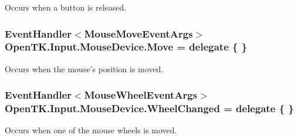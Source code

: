 Occurs when a button is released. 

\hypertarget{class_open_t_k_1_1_input_1_1_mouse_device_ae98bb40aa03f634ecb53a73971dd9097}{
\subsubsection[{Move}]{\setlength{\rightskip}{0pt plus 5cm}Event\-Handler$<${\bf Mouse\-Move\-Event\-Args}$>$ Open\-T\-K.\-Input.\-Mouse\-Device.\-Move = delegate \{ \}}}\label{class_open_t_k_1_1_input_1_1_mouse_device_ae98bb40aa03f634ecb53a73971dd9097}


Occurs when the mouse's position is moved. 

\hypertarget{class_open_t_k_1_1_input_1_1_mouse_device_a4bee8a35ae92c6d4f74868934a5c2475}{
\subsubsection[{Wheel\-Changed}]{\setlength{\rightskip}{0pt plus 5cm}Event\-Handler$<${\bf Mouse\-Wheel\-Event\-Args}$>$ Open\-T\-K.\-Input.\-Mouse\-Device.\-Wheel\-Changed = delegate \{ \}}}\label{class_open_t_k_1_1_input_1_1_mouse_device_a4bee8a35ae92c6d4f74868934a5c2475}


Occurs when one of the mouse wheels is moved. 

